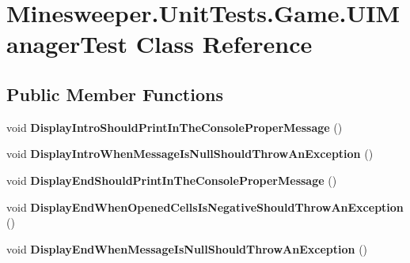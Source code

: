 \hypertarget{class_minesweeper_1_1_unit_tests_1_1_game_1_1_u_i_manager_test}{\section{Minesweeper.\+Unit\+Tests.\+Game.\+U\+I\+Manager\+Test Class Reference}
\label{class_minesweeper_1_1_unit_tests_1_1_game_1_1_u_i_manager_test}
}
\subsection*{Public Member Functions}
\begin{DoxyCompactItemize}
\item 
\hypertarget{class_minesweeper_1_1_unit_tests_1_1_game_1_1_u_i_manager_test_a27d6d58ca5723300d0499d4175184a09}{void {\bfseries Display\+Intro\+Should\+Print\+In\+The\+Console\+Proper\+Message} ()}\label{class_minesweeper_1_1_unit_tests_1_1_game_1_1_u_i_manager_test_a27d6d58ca5723300d0499d4175184a09}

\item 
\hypertarget{class_minesweeper_1_1_unit_tests_1_1_game_1_1_u_i_manager_test_ae378eb70da7d6c8bb8a61172b3cf1ede}{void {\bfseries Display\+Intro\+When\+Message\+Is\+Null\+Should\+Throw\+An\+Exception} ()}\label{class_minesweeper_1_1_unit_tests_1_1_game_1_1_u_i_manager_test_ae378eb70da7d6c8bb8a61172b3cf1ede}

\item 
\hypertarget{class_minesweeper_1_1_unit_tests_1_1_game_1_1_u_i_manager_test_a930b1aad92fdc0ab3dfef625eb37d450}{void {\bfseries Display\+End\+Should\+Print\+In\+The\+Console\+Proper\+Message} ()}\label{class_minesweeper_1_1_unit_tests_1_1_game_1_1_u_i_manager_test_a930b1aad92fdc0ab3dfef625eb37d450}

\item 
\hypertarget{class_minesweeper_1_1_unit_tests_1_1_game_1_1_u_i_manager_test_a7f0fde3bc39476048907edf038984c4f}{void {\bfseries Display\+End\+When\+Opened\+Cells\+Is\+Negative\+Should\+Throw\+An\+Exception} ()}\label{class_minesweeper_1_1_unit_tests_1_1_game_1_1_u_i_manager_test_a7f0fde3bc39476048907edf038984c4f}

\item 
\hypertarget{class_minesweeper_1_1_unit_tests_1_1_game_1_1_u_i_manager_test_a19a0a251d428e09e0f4e37142d53e7b9}{void {\bfseries Display\+End\+When\+Message\+Is\+Null\+Should\+Throw\+An\+Exception} ()}\label{class_minesweeper_1_1_unit_tests_1_1_game_1_1_u_i_manager_test_a19a0a251d428e09e0f4e37142d53e7b9}


\end{DoxyCompactItemize}
